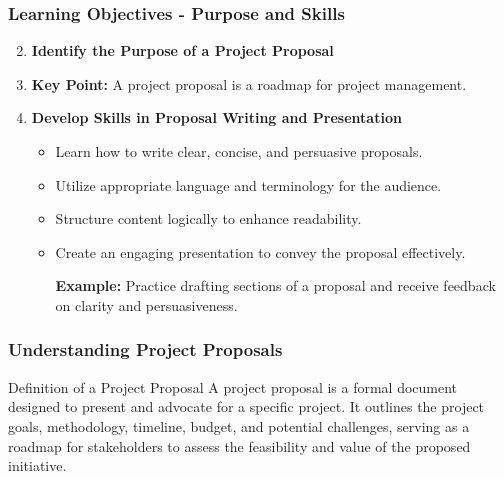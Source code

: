 \documentclass[aspectratio=169]{beamer}
\begin{document}
\begin{frame}[fragile]
    \frametitle{Learning Objectives - Purpose and Skills}
    \begin{enumerate}
        \setcounter{enumi}{1} %
        \item \textbf{Identify the Purpose of a Project Proposal}
                \item \textbf{Key Point:} A project proposal is a roadmap for project management.
                
        \item \textbf{Develop Skills in Proposal Writing and Presentation}
            \begin{itemize}
                \item Learn how to write clear, concise, and persuasive proposals.
                \item Utilize appropriate language and terminology for the audience.
                \item Structure content logically to enhance readability.
                \item Create an engaging presentation to convey the proposal effectively.
                
                \textbf{Example:} Practice drafting sections of a proposal and receive feedback on clarity and persuasiveness.
            \end{itemize}
    \end{enumerate}
\end{frame}

\begin{frame}[fragile]
    \frametitle{Understanding Project Proposals}
    \begin{block}{Definition of a Project Proposal}
        A project proposal is a formal document designed to present and advocate for a specific project. 
        It outlines the project goals, methodology, timeline, budget, and potential challenges, serving as a roadmap for stakeholders to assess the feasibility and value of the proposed initiative.
    \end{block}
\end{frame}
\end{document}
